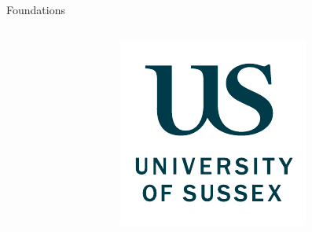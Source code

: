 \documentclass[compress,t,usenames,xcolor=dvipsnames]{beamer}
\begin{document}
\begin{frame}{Foundations}
\begin{columns}
\begin{column}[t]{0.40\textwidth}
        \end{column}
        \begin{column}[t]{0.36\textwidth}
            \centering
            \includegraphics[height=0.30\textheight]{Psychology/ResearchStay/University_of_Sussex_Logo}
        \end{column}
    \end{columns}
    
\end{frame}
\end{document}
